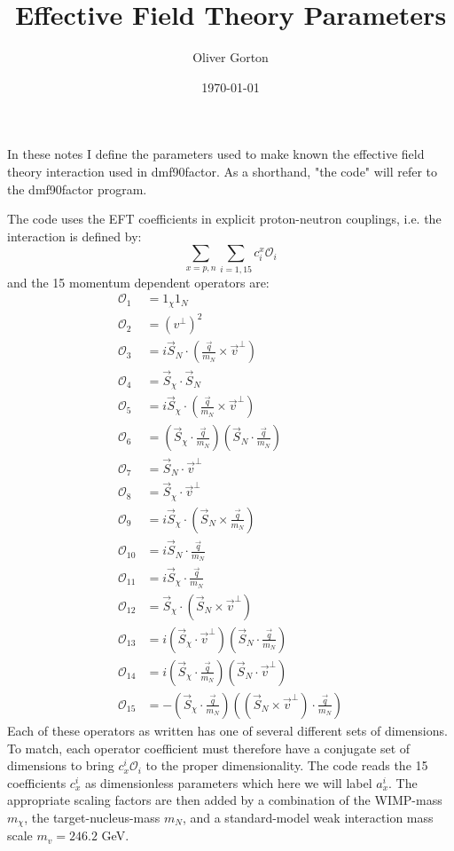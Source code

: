 \documentclass{article}
\title{Effective Field Theory Parameters}
\author{Oliver Gorton}
\date{\today}
\begin{document}
\maketitle

In these notes I define the parameters used to make known the effective field
theory interaction used in dmf90factor. As a shorthand, "the code" will refer to
the dmf90factor program.

The code uses the EFT coefficients in explicit proton-neutron couplings, i.e.
the interaction is defined by:
\begin{equation}
    \sum_{x=p,n}\sum_{i=1,15} c^x_i \mathcal{O} _i
\end{equation}
and the 15 momentum dependent operators are:
\begin{align}
    \mathcal{O} _1 &= 1_\chi 1_N\\
    \mathcal{O} _2 &= (v^\perp)^2\\
    \mathcal{O} _3 &= i\vec{S}_N \cdot \left(\frac{\vec{q}}{m_N}\times
        \vec{v}^\perp\right)\\
    \mathcal{O} _4 &= \vec{S}_\chi \cdot \vec{S}_N\\
    \mathcal{O} _5 &= i\vec{S}_\chi \cdot \left(\frac{\vec{q}}{m_N}\times
        \vec{v}^\perp\right)\\
    \mathcal{O} _6 &= \left(\vec{S}_\chi \cdot \frac{\vec{q}}{m_N} \right)
        \left(\vec{S}_N \cdot \frac{\vec{q}}{m_N} \right) \\
    \mathcal{O} _7 &= \vec{S}_N\cdot \vec{v}^\perp \\
    \mathcal{O} _8 &= \vec{S}_\chi\cdot \vec{v}^\perp \\
    \mathcal{O} _9 &= i\vec{S}_\chi \cdot \left(\vec{S}_N \times
        \frac{\vec{q}}{m_N}\right)\\
    \mathcal{O} _{10} &= i\vec{S}_N \cdot \frac{\vec{q}}{m_N}\\
    \mathcal{O} _{11} &= i\vec{S}_\chi \cdot \frac{\vec{q}}{m_N}\\
    \mathcal{O} _{12} &= \vec{S}_\chi \cdot \left( \vec{S}_N\times 
        \vec{v}^\perp\right)\\
    \mathcal{O} _{13} &= i\left( \vec{S}_\chi \cdot \vec{v}^\perp \right) 
        \left(\vec{S}_N\cdot \frac{\vec{q}}{m_N}\right )\\
    \mathcal{O} _{14} &= i\left( \vec{S}_\chi \cdot \frac{\vec{q}}{m_N} \right) 
        \left(\vec{S}_N\cdot \vec{v}^\perp \right )\\
    \mathcal{O} _{15} &= -\left(\vec{S}_\chi \cdot \frac{\vec{q}}{m_N} \right )
        \left( \left( \vec{S}_N\times \vec{v}^\perp\right)\cdot 
        \frac{\vec{q}}{m_N} \right)
\end{align}
Each of these operators as written has one of several different sets of
dimensions. To match, each operator coefficient must therefore have a conjugate
set of dimensions to bring $c_x^i \mathcal{O}_i$ to the proper dimensionality. 
The code reads the 15 coefficients $c_x^i$ as dimensionless parameters which
here we will label $a_x^i$. The appropriate scaling factors are then added by a
combination of the WIMP-mass $m_\chi$, the target-nucleus-mass $m_N$, and a
standard-model weak interaction mass scale $m_v=246.2$ GeV.
\end{document}
